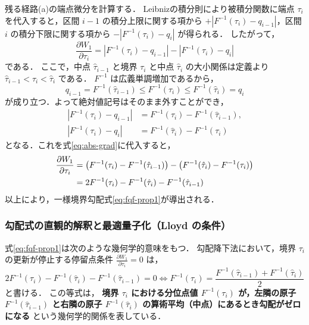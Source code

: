 \documentclass[a4paper,10pt]{jsarticle}
\makeatletter
\theoremstyle{definition}
\renewenvironment{proof}[1][\proofname]{\par
  \pushQED{\qed}%
  \normalfont \topsep6\p@\@plus6\p@\relax
  \trivlist
  \item[\hskip\labelsep\textbf{#1}]\ignorespaces
}{%
  \popQED\endtrivlist\@endpefalse
}
\renewcommand{\proofname}{証明}
\newcommand{\Wone}{W_1}
\renewcommand{\Finv}{F^{-1}}
\makeatother
\begin{document}
\begin{proof}
残る経路(a)の端点微分を計算する．
Leibnizの積分則により被積分関数に端点 $\tau_i$ を代入すると，区間 $i-1$ の積分上限に関する項から $+|\Finv(\tau_i) - q_{i-1}|$，区間 $i$ の積分下限に関する項から $-|\Finv(\tau_i) - q_i|$ が得られる．
したがって，
\begin{equation}
  \frac{\partial \Wone}{\partial\tau_i} = |\Finv(\tau_i) - q_{i-1}| - |\Finv(\tau_i) - q_i|
  \label{eq:abs-grad}
\end{equation}
である．
ここで，中点 $\hat\tau_{i-1}$ と境界 $\tau_i$ と中点 $\hat\tau_i$ の大小関係は定義より $\hat\tau_{i-1} < \tau_i < \hat\tau_i$ である．
$\Finv$ は広義単調増加であるから，
\begin{equation}
  q_{i-1} = \Finv(\hat\tau_{i-1}) \le \Finv(\tau_i) \le \Finv(\hat\tau_i) = q_i
\end{equation}
が成り立つ．よって絶対値記号はそのまま外すことができ，
\begin{align}
  |\Finv(\tau_i) - q_{i-1}| &= \Finv(\tau_i) - \Finv(\hat\tau_{i-1}), \\
  |\Finv(\tau_i) - q_i| &= \Finv(\hat\tau_i) - \Finv(\tau_i)
\end{align}
となる．これを式\eqref{eq:abs-grad}に代入すると，
\begin{align}
  \frac{\partial \Wone}{\partial\tau_i}
  &= \left(\Finv(\tau_i) - \Finv(\hat\tau_{i-1})\right) - \left(\Finv(\hat\tau_i) - \Finv(\tau_i)\right) \notag\\
  &= 2\Finv(\tau_i) - \Finv(\hat\tau_i) - \Finv(\hat\tau_{i-1})
\end{align}
以上により，一様境界勾配式\eqref{eq:fqf-prop1}が導出される．
\end{proof}

\subsubsection{勾配式の直観的解釈と最適量子化（Lloyd の条件）}
式\eqref{eq:fqf-prop1}は次のような幾何学的意味をもつ．
勾配降下法において，境界 $\tau_i$ の更新が停止する停留点条件 $\frac{\partial \Wone}{\partial\tau_i} = 0$ は，
\begin{equation}
  2\Finv(\tau_i) - \Finv(\hat\tau_i) - \Finv(\hat\tau_{i-1}) = 0 \iff \Finv(\tau_i) = \frac{\Finv(\hat\tau_{i-1}) + \Finv(\hat\tau_i)}{2}
  \label{eq:lloyd-boundary}
\end{equation}
と書ける．
この等式は，
\textbf{境界 $\tau_i$ における分位点値 $\Finv(\tau_i)$ が，左隣の原子 $\Finv(\hat\tau_{i-1})$ と右隣の原子 $\Finv(\hat\tau_i)$ の算術平均（中点）にあるとき勾配がゼロになる}
という幾何学的関係を表している．
\end{document}
